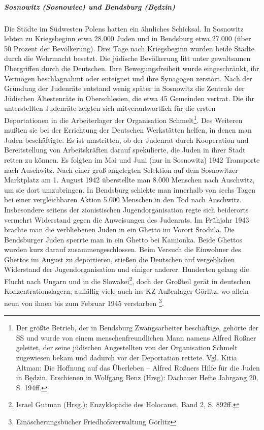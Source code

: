 \subparagraph{Sosnowitz (Sosnowiec) und Bendsburg (Będzin)} Die Städte im Südwesten Polens hatten ein ähnliches Schicksal. In Sosnowitz lebten zu Kriegsbeginn etwa 28.000 Juden und in Bendsburg etwa 27.000 (über 50 Prozent der Bevölkerung). Drei Tage nach Kriegsbeginn wurden beide Städte durch die Wehrmacht besetzt. Die jüdische Bevölkerung litt unter gewaltsamen Übergriffen durch die Deutschen. Ihre Bewegungsfreiheit wurde eingeschränkt, ihr Vermögen beschlagnahmt oder enteignet und ihre Synagogen zerstört. Nach der Gründung der Judenräte entstand wenig später in Sosnowitz die \glqq Zentrale der Jüdischen Ältestenräte in Oberschlesien\grqq, die etwa 45 Gemeinden vertrat. Die ihr unterstellten Judenräte zeigten sich mitverantwortlich für die ersten Deportationen in die Arbeiterlager der Organisation Schmelt\footnote{Der größte Betrieb, der in Bendsburg Zwangsarbeiter beschäftige, gehörte der SS und wurde von einem menschenfreundlichen Mann namens Alfred Roßner geleitet, der seine jüdischen Angestellten von der Organisation Schmelt zugewiesen bekam und dadurch vor der Deportation rettete. Vgl. Kitia Altman: Die Hoffnung auf das Überleben -- Alfred Roßners Hilfe für die Juden in Będzin. Erschienen in Wolfgang Benz (Hrsg): Dachauer Hefte Jahrgang 20, S. 194ff.}. Des Weiteren mußten sie bei der Errichtung der Deutschen Werkstätten helfen, in denen man Juden beschäftigte. Es ist umstritten, ob der Judenrat durch Kooperation und Bereitstellung von Arbeitskräften darauf spekulierte, die Juden in ihrer Stadt retten zu können. Es folgten im Mai und Juni (nur in Sosnowitz) 1942 Transporte nach Auschwitz. Nach einer groß angelegten Selektion auf dem Sosnowitzer Marktplatz am 1. August 1942 überstellte man 8.000 Menschen nach Auschwitz, um sie dort umzubringen. In Bendsburg schickte man innerhalb von sechs Tagen bei einer vergleichbaren Aktion 5.000 Menschen in den Tod nach Auschwitz. Insbesondere seitens der zionistischen Jugendorganisation regte sich beiderorts vermehrt Widerstand gegen die Anweisungen des Judenrats. Im Frühjahr 1943 brachte man die verbliebenen Juden in ein Ghetto im Vorort Srodula. Die Bendsburger Juden sperrte man in ein Ghetto bei Kamionka. Beide Ghettos wurden kurz darauf zusammengeschlossen. Beim Versuch die Einwohner des Ghettos im August zu deportieren, stießen die Deutschen auf vergeblichen Widerstand der Jugendorganisation und einiger anderer. Hunderten gelang die Flucht nach Ungarn und in die Slowakei\footnote{Israel Gutman (Hrsg.): Enzyklopädie des Holocaust, Band 2, S. 892ff.}, doch der Großteil gerät in deutschen Konzentrationslagern; auffällig viele auch ins KZ-Außenlager Görlitz, wo allein neun von ihnen bis zum Februar 1945 verstarben \footnote{Einäscherungsbücher Friedhofsverwaltung Görlitz}.

